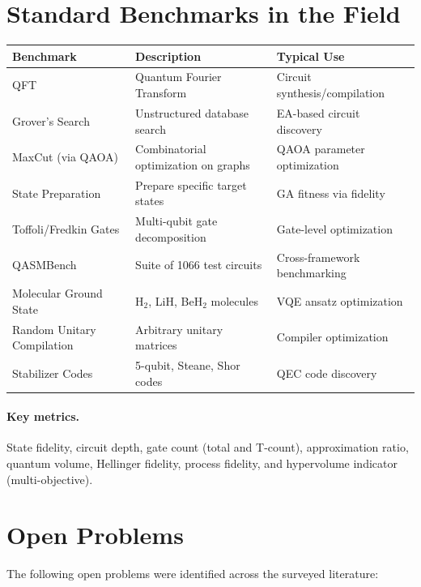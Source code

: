 \documentclass[11pt]{article}
\begin{document}
\section{Standard Benchmarks in the Field}
\label{sec:benchmarks}

\begin{longtable}{p{4cm} p{5cm} p{5cm}}
\toprule
\textbf{Benchmark} & \textbf{Description} & \textbf{Typical Use} \\
\midrule
\endhead
QFT & Quantum Fourier Transform & Circuit synthesis/compilation \\
Grover's Search & Unstructured database search & EA-based circuit discovery \\
MaxCut (via QAOA) & Combinatorial optimization on graphs & QAOA parameter optimization \\
State Preparation & Prepare specific target states & GA fitness via fidelity \\
Toffoli/Fredkin Gates & Multi-qubit gate decomposition & Gate-level optimization \\
QASMBench & Suite of 1066 test circuits & Cross-framework benchmarking \\
Molecular Ground State & H$_2$, LiH, BeH$_2$ molecules & VQE ansatz optimization \\
Random Unitary Compilation & Arbitrary unitary matrices & Compiler optimization \\
Stabilizer Codes & 5-qubit, Steane, Shor codes & QEC code discovery \\
\bottomrule
\end{longtable}

\paragraph{Key metrics.} State fidelity, circuit depth, gate count (total and T-count), approximation ratio, quantum volume, Hellinger fidelity, process fidelity, and hypervolume indicator (multi-objective).

\section{Open Problems}
\label{sec:open}

The following open problems were identified across the surveyed literature:
\end{document}
